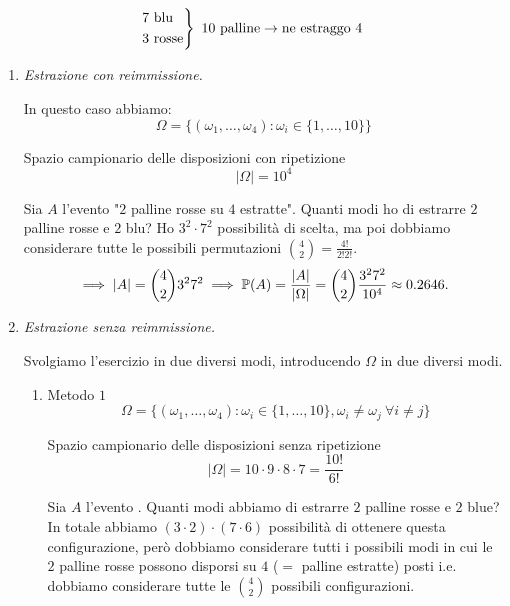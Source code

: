 \Soluzione

\begin{equation*}
	\begin{drcases}
		7\ \text{blu}\\
		3\ \text{rosse}
	\end{drcases}
	\ 10\ \text{palline}\rightarrow \text{ne estraggo} \ 4
\end{equation*}
\begin{enumerate}
	\item \textit{Estrazione con reimmissione.}

	In questo caso abbiamo:
	\begin{equation*}
	\Omega =\{(\omega_{1} ,\dots ,\omega_{4}) :\omega_{i} \in \{1,\dots ,10\}\}
	\end{equation*}

	Spazio campionario delle disposizioni con ripetizione
	\begin{equation*}
	| \Omega | =10^{4}
	\end{equation*}

	Sia $A$ l'evento "$2$ palline rosse su $4$ estratte". Quanti modi ho di estrarre $2$ palline rosse e $2$ blu? Ho $3^{2} \cdot 7^{2}$ possibilità di scelta, ma poi dobbiamo considerare tutte le possibili permutazioni $\binom{4}{2} =\frac{4!}{2!2!}$.
	\begin{equation*}
		\implies | A| =\binom{4}{2} 3^{2} 7^{2}\implies \mathbb{P}(A) =\frac{| A| }{| \Omega | } =\binom{4}{2}\frac{3^{2} 7^{2}}{10^{4}} \approx 0.2646.
	\end{equation*}
	\item \textit{Estrazione senza reimmissione.}

	Svolgiamo l'esercizio in due diversi modi, introducendo $\Omega $ in due diversi modi.
	\begin{enumerate}
		\item Metodo $1$
		\begin{equation*}
			\Omega =\{(\omega_{1} ,\dots ,\omega_{4}) :\omega_{i} \in \{1,\dots ,10\} ,\omega_{i} \neq \omega_{j} \ \forall i\neq j\}
		\end{equation*}

		Spazio campionario delle disposizioni senza ripetizione
		\begin{equation*}
			| \Omega | =10\cdot 9\cdot 8\cdot 7=\frac{10!}{6!}
		\end{equation*}

		Sia $A$ l'evento . Quanti modi abbiamo di estrarre $2$ palline rosse e $2$ blue? In totale abbiamo $(3\cdot 2) \cdot (7\cdot 6)$ possibilità di ottenere questa configurazione, però dobbiamo considerare tutti i possibili modi in cui le $2$ palline rosse possono disporsi su $4$ ($=$ palline estratte) posti i.e. dobbiamo considerare tutte le $\binom{4}{2}$ possibili configurazioni.


\end{enumerate}
\end{enumerate}
